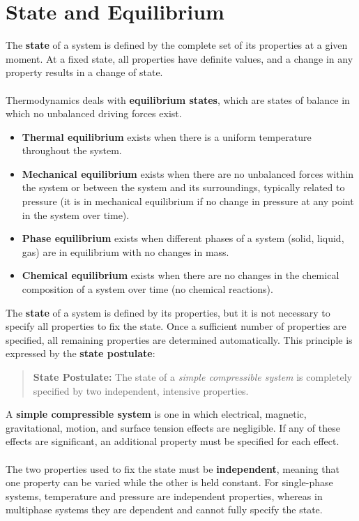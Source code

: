 \documentclass[12pt]{article}
\begin{document}
\section*{State and Equilibrium}
The \textbf{state} of a system is defined by the complete set of its properties at a given moment. At a fixed state, all properties have definite values, and a change in any property results in a change of state.\\\\
Thermodynamics deals with \textbf{equilibrium states}, which are states of balance in which no unbalanced driving forces exist.
\begin{itemize}
\item \textbf{Thermal equilibrium} exists when there is a uniform temperature throughout the system. 
\item \textbf{Mechanical equilibrium} exists when there are no unbalanced forces within the system or between the system and its surroundings, typically related to pressure (it is in mechanical equilibrium if no change in pressure at any point in the system over time). 
\item \textbf{Phase equilibrium} exists when different phases of a system (solid, liquid, gas) are in equilibrium with no changes in mass. 
\item \textbf{Chemical equilibrium} exists when there are no changes in the chemical composition of a system over time (no chemical reactions).
\end{itemize}
The \textbf{state} of a system is defined by its properties, but it is not necessary to specify all properties to fix the state. Once a sufficient number of properties are specified, all remaining properties are determined automatically. This principle is expressed by the \textbf{state postulate}:

\begin{quote}
\textbf{State Postulate:} The state of a \emph{simple compressible system} is completely specified by two independent, intensive properties.
\end{quote}\noindent
A \textbf{simple compressible system} is one in which electrical, magnetic, gravitational, motion, and surface tension effects are negligible. If any of these effects are significant, an additional property must be specified for each effect.\\\\
The two properties used to fix the state must be \textbf{independent}, meaning that one property can be varied while the other is held constant. For single-phase systems, temperature and pressure are independent properties, whereas in multiphase systems they are dependent and cannot fully specify the state.
\end{document}
